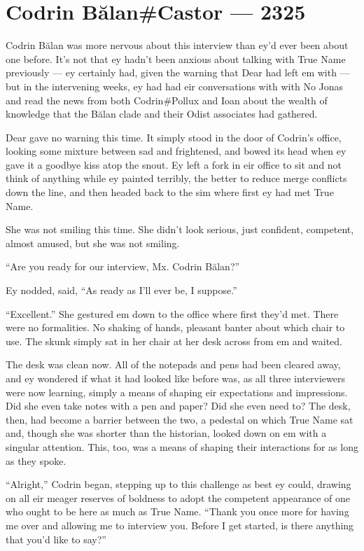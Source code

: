 \hypertarget{codrin-bux103lancastor-2325}{%
\chapter{Codrin Bălan\#Castor — 2325}\label{codrin-bux103lancastor-2325}}

Codrin Bălan was more nervous about this interview than ey'd ever been about one before. It's not that ey hadn't been anxious about talking with True Name previously — ey certainly had, given the warning that Dear had left em with — but in the intervening weeks, ey had had eir conversations with with No Jonas and read the news from both Codrin\#Pollux and Ioan about the wealth of knowledge that the Bălan clade and their Odist associates had gathered.

Dear gave no warning this time. It simply stood in the door of Codrin's office, looking some mixture between sad and frightened, and bowed its head when ey gave it a goodbye kiss atop the snout. Ey left a fork in eir office to sit and not think of anything while ey painted terribly, the better to reduce merge conflicts down the line, and then headed back to the sim where first ey had met True Name.

She was not smiling this time. She didn't look serious, just confident, competent, almost amused, but she was not smiling.

``Are you ready for our interview, Mx. Codrin Bălan?''

Ey nodded, said, ``As ready as I'll ever be, I suppose.''

``Excellent.'' She gestured em down to the office where first they'd met. There were no formalities. No shaking of hands, pleasant banter about which chair to use. The skunk simply sat in her chair at her desk across from em and waited.

The desk was clean now. All of the notepads and pens had been cleared away, and ey wondered if what it had looked like before was, as all three interviewers were now learning, simply a means of shaping eir expectations and impressions. Did she even take notes with a pen and paper? Did she even need to? The desk, then, had become a barrier between the two, a pedestal on which True Name sat and, though she was shorter than the historian, looked down on em with a singular attention. This, too, was a means of shaping their interactions for as long as they spoke.

``Alright,'' Codrin began, stepping up to this challenge as best ey could, drawing on all eir meager reserves of boldness to adopt the competent appearance of one who ought to be here as much as True Name. ``Thank you once more for having me over and allowing me to interview you. Before I get started, is there anything that you'd like to say?''

